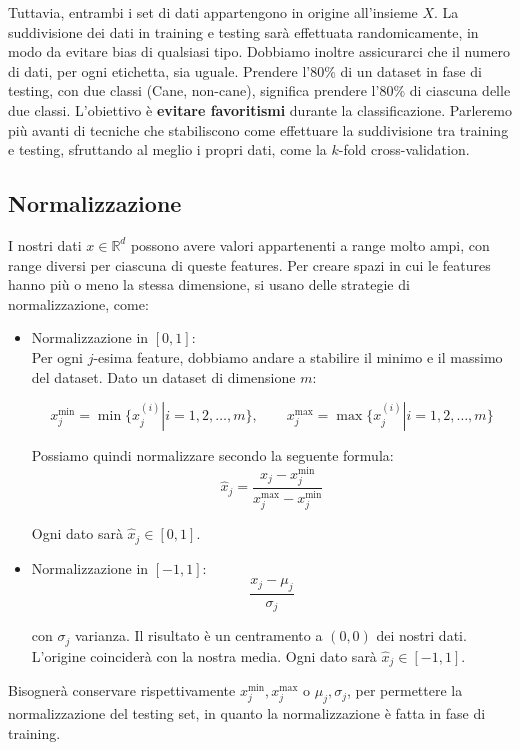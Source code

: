 Tuttavia, entrambi i set di dati appartengono in origine all'insieme $X$. La suddivisione dei dati in training e testing sarà effettuata randomicamente, in modo da evitare bias di qualsiasi tipo. Dobbiamo inoltre assicurarci che il numero di dati, per ogni etichetta, sia uguale. Prendere l'80\% di un dataset in fase di testing, con due classi (Cane, non-cane), significa prendere l'80\% di ciascuna delle due classi. L'obiettivo è \textbf{evitare favoritismi} durante la classificazione. Parleremo più avanti di tecniche che stabiliscono come effettuare la suddivisione tra training e testing, sfruttando al meglio i propri dati, come la $k$-fold cross-validation.


\subsection{Normalizzazione}
I nostri dati $x \in \mathbb{R}^d$ possono avere valori appartenenti a range molto ampi, con range diversi per ciascuna di queste features. Per creare spazi in cui le features hanno più o meno la stessa dimensione, si usano delle strategie di normalizzazione, come: 

\begin{itemize}
	\item Normalizzazione in $[0,1]$:\\
	Per ogni $j$-esima feature, dobbiamo andare a stabilire il minimo e il massimo del dataset. Dato un dataset di dimensione $m$:
	
	$$
	x_j^{\min } = \min\{x_j^{(i)} | i = 1, 2, \dots, m\}, \qquad 
	x_j^{\max} = \max\{x_j^{(i)} | i = 1, 2, \dots, m\}
	$$
	
	Possiamo quindi normalizzare secondo la seguente formula:
	$$
	\hat{x}_j = \frac{x_j - x_j^{\min}}{x_j^{\max} - x_j^{\min}}
	$$
	
	Ogni dato sarà $\hat{x}_j \in [0,1]$.
	
	\item Normalizzazione in $[-1,1]$:\\
	$$
	\frac{x_j - \mu_j}{\sigma_j}
	$$
	
	con $\sigma_j$ varianza. Il risultato è un centramento a $(0,0)$ dei nostri dati. L'origine coinciderà con la nostra media. Ogni dato sarà $\hat{x}_j \in [-1,1]$.
	
\end{itemize}

Bisognerà conservare rispettivamente $x_j^{\min }, x_j^{\max }$ o $\mu_j, \sigma_j$, per permettere la normalizzazione del testing set, in quanto la normalizzazione è fatta in fase di training.

